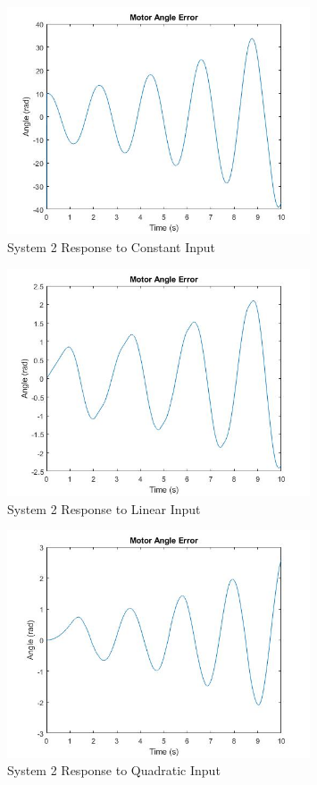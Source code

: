 \begin{figure}[H]
        \centering
        \includegraphics[width=0.8\textwidth]{./figures/lab4_fig10-part4-3-3-error-rc-I=1-constant.jpg}
        \caption{System 2 Response to Constant Input}
        \label{fig:system2_constant}
\end{figure}

\begin{figure}[H]
        \centering
        \includegraphics[width=0.8\textwidth]{./figures/lab4_fig11-part4-3-3-error-rc-I=1-linear.jpg}
        \caption{System 2 Response to Linear Input}
        \label{fig:system2_linear}
\end{figure}

\begin{figure}[H]
        \centering
        \includegraphics[width=0.8\textwidth]{./figures/lab4_fig12-part4-3-3-error-rc-I=1-quadratic.jpg}
        \caption{System 2 Response to Quadratic Input}
        \label{fig:system2_quadratic}
\end{figure}

